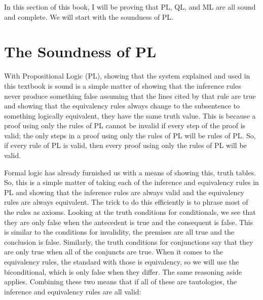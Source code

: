 In this section of this book, I will be proving that PL, QL, and ML are all sound and complete.  We will start with the soundness of PL.

\section{The Soundness of PL} 
With Propositional Logic (PL), showing that the system explained and used in this textbook is sound is a simple matter of showing that the inference rules never produce something false assuming that the lines cited by that rule are true and showing that the equivalency rules always change to the subsentence to something logically equivalent, they have the same truth value. This is because a proof using only the rules of PL cannot be invalid if every step of the proof is valid; the only steps in a proof using only the rules of PL will be rules of PL. So, if every rule of PL is valid, then every proof using only the rules of PL will be valid. 

Formal logic has already furnished us with a means of showing this, truth tables. So, this is a simple matter of taking each of the inference and equivalency rules in PL and showing that the inference rules are always valid and the equivalency rules are always equivalent. The trick to do this efficiently is to phrase most of the rules as axioms. Looking at the truth conditions for conditionals, we see that they are only false when the antecedent is true and the consequent is false. This is similar to the conditions for invalidity, the premises are all true and the conclusion is false. Similarly, the truth conditions for conjunctions say that they are only true when all of the conjuncts are true. When it comes to the equivalency rules, the standard with those is equivalency, so we will use the biconditional, which is only false when they differ. The same reasoning aside applies. Combining these two means that if all of these are tautologies, the inference and equivalency rules are all valid:

